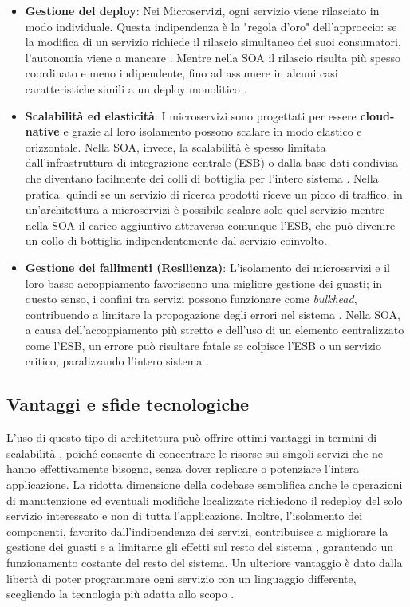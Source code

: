 \begin{itemize}
\item \textbf{Gestione del deploy}: Nei Microservizi, ogni servizio viene rilasciato in modo individuale. Questa indipendenza è la "regola d'oro" dell'approccio: se la modifica di un servizio richiede il rilascio simultaneo dei suoi consumatori, l'autonomia viene a mancare \cite{Newman2015}. Mentre nella SOA il rilascio risulta più spesso coordinato e meno indipendente, fino ad assumere in alcuni casi caratteristiche simili a un deploy monolitico \cite{Cerny2017SOAvsMicroservices}.
\item \textbf{Scalabilità ed elasticità}: I microservizi sono progettati per essere \textbf{cloud-native} e grazie al loro isolamento possono scalare in modo elastico e orizzontale. Nella SOA, invece, la scalabilità è spesso limitata dall'infrastruttura di integrazione centrale (ESB) o dalla base dati condivisa che diventano facilmente dei colli di bottiglia per l'intero sistema \cite{Cerny2017SOAvsMicroservices}.
Nella pratica, quindi se un servizio di ricerca prodotti riceve un picco di traffico, in un'architettura a microservizi è possibile scalare solo quel servizio mentre nella SOA il carico aggiuntivo attraversa comunque l'ESB, che può divenire un collo di bottiglia indipendentemente dal servizio coinvolto.
\item \textbf{Gestione dei fallimenti (Resilienza)}: L’isolamento dei microservizi e il loro basso accoppiamento favoriscono una migliore gestione dei guasti; in questo senso, i confini tra servizi possono funzionare come \textit{bulkhead}, contribuendo a limitare la propagazione degli errori nel sistema \cite{Newman2015}. Nella SOA, a causa dell'accoppiamento più stretto e dell'uso di un elemento centralizzato come l'ESB, un errore può risultare fatale se colpisce l'ESB o un servizio critico, paralizzando l'intero sistema \cite{Cerny2017SOAvsMicroservices}.

\end{itemize}

\subsection{Vantaggi e sfide tecnologiche}
L’uso di questo tipo di architettura può offrire ottimi vantaggi in termini di scalabilità \cite{Soldani2018PainsGains}, poiché consente di concentrare le risorse sui singoli servizi che ne hanno effettivamente bisogno, senza dover replicare o potenziare l’intera applicazione.
La ridotta dimensione della codebase semplifica anche le operazioni di manutenzione \cite{Dragoni2017} ed eventuali modifiche localizzate richiedono il redeploy del solo servizio interessato e non di tutta l'applicazione. Inoltre, l’isolamento dei componenti, favorito dall’indipendenza dei servizi, contribuisce a migliorare la gestione dei guasti e a limitarne gli effetti sul resto del sistema \cite{Soldani2018PainsGains}, garantendo un funzionamento costante del resto del sistema. Un ulteriore vantaggio è dato dalla libertà di poter programmare ogni servizio con un linguaggio differente, scegliendo la tecnologia più adatta allo scopo \cite{Fowler2014}. 

